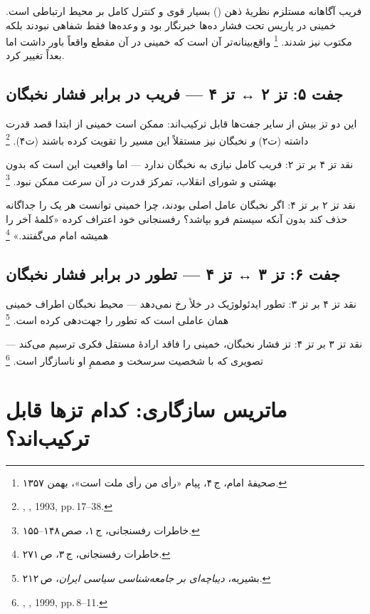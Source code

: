 \begin{warningBox}[نقد تز ۳ بر تز ۲]
فریب آگاهانه مستلزم نظریهٔ ذهن
() بسیار قوی
و کنترل کامل بر محیط ارتباطی است.
خمینی در پاریس تحت فشار ده‌ها خبرنگار بود
و وعده‌ها فقط شفاهی نبودند بلکه مکتوب نیز شدند.%
\footnote{صحیفهٔ امام، ج\,۴، پیام «رأی من رأی ملت است»، بهمن ۱۳۵۷.}
واقع‌بینانه‌تر آن است که خمینی
در آن مقطع واقعاً باور داشت اما بعداً تغییر کرد.
\end{warningBox}

\subsection{جفت ۵: تز ۲ ↔ تز ۴ — فریب در برابر فشار نخبگان}
\label{subsec:pair-t2t4}

\begin{noteBox}
این دو تز بیش از سایر جفت‌ها قابل ترکیب‌اند:
ممکن است خمینی از ابتدا قصد قدرت داشته (ت‌۲)
\emph{و} نخبگان نیز مستقلاً این مسیر را تقویت کرده باشند (ت‌۴).%
\footnote{,
\textit{}, 1993, pp.\,17–38.}
\end{noteBox}

نقد تز ۴ بر تز ۲:
فریب کامل نیازی به نخبگان ندارد — اما واقعیت این است
که بدون بهشتی و شورای انقلاب،
تمرکز قدرت در آن سرعت ممکن نبود.%
\footnote{خاطرات رفسنجانی، ج\,۱، صص\,۱۴۸–۱۵۵.}

نقد تز ۲ بر تز ۴:
اگر نخبگان عامل اصلی بودند،
چرا خمینی توانست هر یک را جداگانه حذف کند
بدون آنکه سیستم فرو بپاشد؟
رفسنجانی خود اعتراف کرده
«کلمهٔ آخر را همیشه امام می‌گفتند.»%
\footnote{خاطرات رفسنجانی، ج\,۳، ص\,۲۷۱.}

\subsection{جفت ۶: تز ۳ ↔ تز ۴ — تطور در برابر فشار نخبگان}
\label{subsec:pair-t3t4}

نقد تز ۴ بر تز ۳:
تطور ایدئولوژیک در خلأ رخ نمی‌دهد —
محیط نخبگان اطراف خمینی
همان عاملی است که تطور را جهت‌دهی کرده است.%
\footnote{بشیریه، \textit{دیباچه‌ای بر جامعه‌شناسی سیاسی ایران}،
ص\,۲۱۲.}

نقد تز ۳ بر تز ۴:
تز فشار نخبگان، خمینی را فاقد ارادهٔ مستقل
فکری ترسیم می‌کند — تصویری که با شخصیت
سرسخت و مصممِ او ناسازگار است.%
\footnote{, \textit{}, 1999, pp.\,8–11.}

\section{ماتریس سازگاری: کدام تزها قابل ترکیب‌اند؟}
\label{sec:ch14-compat}

